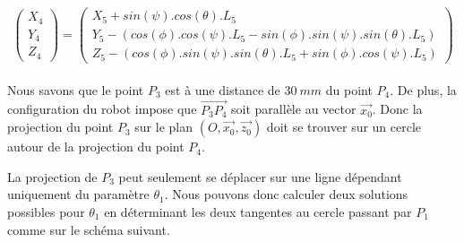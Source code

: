 \begin{equation}
\left( \begin{array}{c}X_4\\Y_4\\Z_4 \end{array} \right) 
= 
\left ( \begin{array}{c}
X_5 + sin(\psi) . cos(\theta) . L_5\\
Y_5 - (cos(\phi) . cos(\psi) . L_5 - sin(\phi) . sin(\psi) . sin(\theta) . L_5)\\
Z_5 - (cos(\phi) . sin(\psi) . sin(\theta) . L_5 + sin(\phi) . cos(\psi) . L_5)
\end{array} \right )
\end{equation}\\

Nous savons que le point $P_3$ est à une distance de $30~mm$ du point $P_4$.
De plus, la configuration du robot impose que $\overrightarrow{P_3P_4}$ soit parall\`ele au vector $\vec{x_0}$.
Donc la projection du point $P_3$ sur le plan $(O,\vec{x_0},\vec{z_0})$ doit se trouver sur un cercle autour de la projection du point $P_4$.

La projection de $P_3$ peut seulement se d\'eplacer sur une ligne d\'ependant uniquement du param\`etre $\theta_1$.
Nous pouvons donc calculer deux solutions possibles pour $\theta_1$ en d\'eterminant les deux tangentes au cercle passant par $P_1$ comme sur le sch\'ema suivant.

\begin{center}
\end{center}

